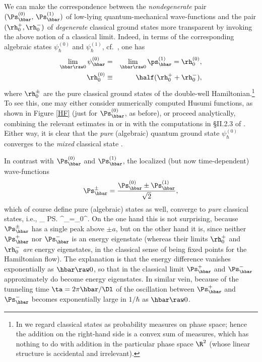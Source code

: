 \documentclass[12pt]{article}
\begin{document}
We can make the correspondence between the \emph{nondegenerate} pair $(\Ps^{(0)}_{\hbar},\,\Ps_{\hbar}^{(1)})$  of low-lying quantum-mechanical  wave-functions and the pair $(\rh_0^+,\rh_0^-)$ of \emph{degenerate} classical ground states  more transparent  by invoking the above notion of a classical limit.  Indeed, in terms of the corresponding algebraic states $\psi^{(0)}_{\hbar}$ and  $\psi_{\hbar}^{(1)}$, cf.\ ,  one has
\begin{eqnarray}
{\lim_{\hbar\raw 0} \psi_{\hbar}^{(0)}}&=&\lim_{\hbar\raw 0} \ps^{(1)}_{\hbar}=\rh_0^{(0)}, \label{1.5} \\
\rh_0^{(0)}&\equiv& \half(\rh_0^+ + \rh_0^-), \label{1.6}
\end{eqnarray}
where $\rh_0^{\pm}$ are the pure classical ground states  of the double-well Hamiltonian.\footnote{In   we regard classical states as probability measures on phase space; hence the addition on the right-hand side is a convex sum of measures, which has nothing to do with addition in the particular phase space $\R^2$ (whose linear structure is accidental and irrelevant). } 
To see this, one may either consider numerically computed Husumi functions, as  shown in Figure \ref{HF} (just for $\Ps^{(0)}_{\hbar}$, as before), 
or proceed analytically, combining the relevant estimates in \cite{Harrell} or in \cite{Simon4} with the computations in \S II.2.3 of \cite{book}.
Either way, it is clear that
 the \emph{pure} (algebraic) quantum ground state $\psi_{\hbar}^{(0)}$
 converges to the \emph{mixed} classical state .
 
In contrast with $\Ps_{\hbar}^{(0)}$ and $\Ps_{\hbar}^{(1)}$, the localized (but now time-dependent) wave-functions
\begin{equation}
\Ps_{\hbar}^{\pm}= \frac{\Ps_{\hbar}^{(0)}\pm\Ps_{\hbar}^{(1)}}{\sqrt{2}}, \label{plusmin}
\end{equation}
which of course define pure (algebraic) states as well, converge to \emph{pure} classical states, i.e., 
\beq
\lim_{\hbar{}} \ps^{\pm}_{\hbar}=\rh_0^{\pm}.\label{1.7}
\eeq
On the one hand this is not surprising, because $\Ps_{\hbar}^{\pm}$ has a single peak above $\pm a$, but on the other hand it is, since neither $\Ps_{\hbar}^+$ nor $\Ps_{\hbar}^-$ is an energy eigenstate (whereas their limits $\rh_0^+$ and $\rh_0^-$ \emph{are} energy eigenstates, in the classical sense of being fixed points for the Hamiltonian flow). The explanation is that the energy difference  vanishes exponentially as $\hbar\raw 0$, so that  in the classical limit $\Ps_{\hbar}^+$ and $\Ps_{\hbar}^-$ approximately do become energy eigenstates. In similar vein, because of  the tunneling time  $\ta=2\pi\hbar/\Dl$ of the oscillation between $\Ps_{\hbar}^+$ and $\Ps_{\hbar}^-$  becomes exponentially large in $1/\hbar$ as $\hbar\raw 0$.
\end{document}
